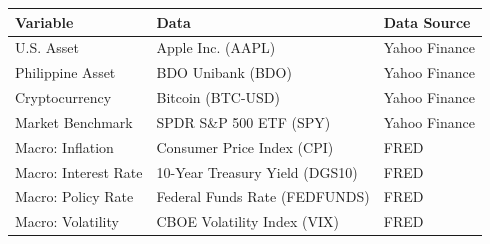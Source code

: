 \documentclass[border=4pt]{standalone}
\begin{document}
\begin{tabular}{lll}
\toprule
\textbf{Variable} & \textbf{Data} & \textbf{Data Source} \\
\midrule
U.S. Asset & Apple Inc. (AAPL) & Yahoo Finance \\
Philippine Asset & BDO Unibank (BDO) & Yahoo Finance \\
Cryptocurrency & Bitcoin (BTC-USD) & Yahoo Finance \\
Market Benchmark & SPDR S\&P 500 ETF (SPY) & Yahoo Finance \\
Macro: Inflation & Consumer Price Index (CPI) & FRED \\
Macro: Interest Rate & 10-Year Treasury Yield (DGS10) & FRED \\
Macro: Policy Rate & Federal Funds Rate (FEDFUNDS) & FRED \\
Macro: Volatility & CBOE Volatility Index (VIX) & FRED \\
\bottomrule
\end{tabular}
\end{document}
